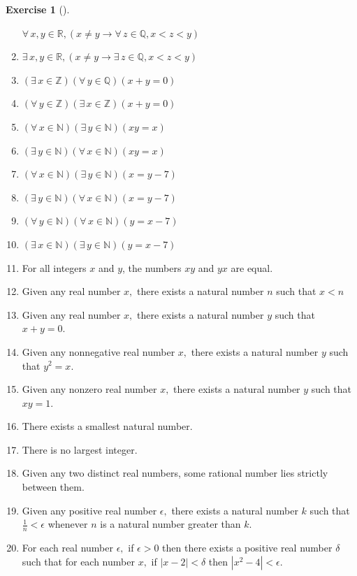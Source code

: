 \documentclass[
  letterpaper,
  10pt,
  reqno,
  twopage,
  openany]{book}
\theoremstyle{plain}
\theoremstyle{definition}
\newtheorem{exercise}{Exercise}[chapter]
\theoremstyle{definition}
\theoremstyle{definition}
\theoremstyle{plain}
\theoremstyle{plain}
\theoremstyle{remark}
\begin{document}
\begin{exercise}[]
\begin{enumerate}
  \(\forall \, x,y\in \mathbb{R}, (x\neq y\rightarrow \forall \, z\in \mathbb{Q}, x<z<y)\)
\item
  \(\exists \, x,y\in \mathbb{R}, (x\neq y \rightarrow \exists \, z\in \mathbb{Q}, x<z<y)\)
\item
  \((\exists \, x\in \mathbb{Z})(\forall \, y\in \mathbb{Q})(x+y=0)\)
\item
  \((\forall \, y\in \mathbb{Z})(\exists \, x\in \mathbb{Z})(x+y=0)\)
\item
  \((\forall \, x\in \mathbb{N})(\exists \, y\in \mathbb{N})(x y=x)\)
\item
  \((\exists \, y\in \mathbb{N})(\forall \, x\in \mathbb{N})(x y=x)\)
\item
  \((\forall \, x\in \mathbb{N})(\exists \, y\in \mathbb{N})(x=y-7)\)
\item
  \((\exists \, y\in \mathbb{N})(\forall \, x\in \mathbb{N})(x=y-7)\)
\item
  \((\forall \, y\in \mathbb{N})(\forall \, x\in \mathbb{N})(y=x-7)\)
\item
  \((\exists \, x\in \mathbb{N})(\exists \, y\in \mathbb{N})(y=x-7)\)
\item
  For all integers \(x\) and \(y\), the numbers \(x y\) and \(y x\) are
  equal.
\item
  Given any real number \(x,\) there exists a natural number \(n\) such
  that \(x<n\)
\item
  Given any real number \(x,\) there exists a natural number \(y\) such
  that \(x+y=0.\)
\item
  Given any nonnegative real number \(x,\) there exists a natural number
  \(y\) such that \(y^2=x.\)
\item
  Given any nonzero real number \(x,\) there exists a natural number
  \(y\) such that \(x y=1.\)
\item
  There exists a smallest natural number.
\item
  There is no largest integer.
\item
  Given any two distinct real numbers, some rational number lies
  strictly between them.
\item
  Given any positive real number \(\epsilon ,\) there exists a natural
  number \(k\) such that \(\frac{1}{n} < \epsilon\) whenever \(n\) is a
  natural number greater than \(k.\)
\item
  For each real number \(\epsilon ,\) if \(\epsilon >0\) then there
  exists a positive real number \(\delta\) such that for each number
  \(x,\) if \(|x-2|<\delta\) then \(\left|x^2-4\right|<\epsilon .\)
\end{enumerate}

\end{exercise}
\end{document}
